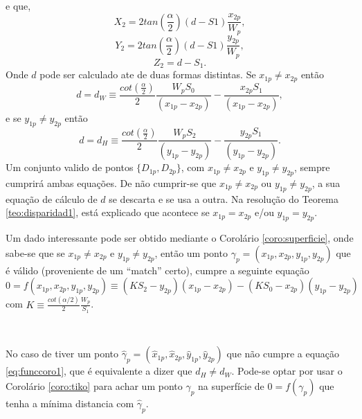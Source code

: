 \documentclass[a4paper,10pt]{article}
\begin{document}
e que,
\begin{equation}\label{eq:desloca3}
 X_2=2 tan(\frac{\alpha}{2})(d-S1)\frac{x_{2p}}{W_p},
\end{equation}
\begin{equation}\label{eq:desloca3a}
 Y_2=2 tan(\frac{\alpha}{2})(d-S1)\frac{y_{2p}}{W_p},
\end{equation}
\begin{equation}\label{eq:desloca4a}
 Z_2=d-S_1.
\end{equation}
Onde $d$ pode ser calculado ate de duas formas distintas. 
Se $x_{1p}\neq x_{2p}$ então
\begin{equation}\label{eq:desloca1}
 d=d_W \equiv \frac{cot(\frac{\alpha}{2})}{2} \frac{W_p S_0}{(x_{1p}-x_{2p})}-\frac{x_{2p} S_1}{(x_{1p}-x_{2p})},
\end{equation}
e se $y_{1p}\neq y_{2p}$ então
\begin{equation}\label{eq:desloca1a}
 d=d_H \equiv \frac{cot(\frac{\alpha}{2})}{2} \frac{W_p S_2}{(y_{1p}-y_{2p})}-\frac{y_{2p} S_1}{(y_{1p}-y_{2p})}.
\end{equation}
Um conjunto valido de pontos $\{D_{1p},D_{2p}\}$, com $x_{1p} \neq x_{2p}$ e $y_{1p} \neq y_{2p}$, sempre cumprirá ambas equações.
De não cumprir-se que $x_{1p} \neq x_{2p}$ ou $y_{1p} \neq y_{2p}$, a sua equação  de cálculo de $d$ se descarta e se usa a outra. 
Na resolução do Teorema \ref{teo:disparidad1}, está explicado que acontece se $x_{1p} = x_{2p}$ e/ou $y_{1p} = y_{2p}$.
~\\

\begin{bclogo}[couleur=gray!30, arrondi=0.1,logo=\bccrayon,ombre=true]{}
Um dado interessante pode ser obtido mediante o Corolário \ref{coro:superficie},
onde sabe-se que se $x_{1p}\neq x_{2p}$ e $y_{1p}\neq y_{2p}$, então um ponto  $\gamma_p=(x_{1p},x_{2p},y_{1p},y_{2p})$
que é  válido (proveniente de um ``match'' certo), cumpre a seguinte equação
 \begin{equation}\label{eq:funccoro1}
  0 = f(x_{1p},x_{2p},y_{1p},y_{2p}) \equiv (K S_2-y_{2p})(x_{1p}-x_{2p})-(K S_0-x_{2p})(y_{1p}-y_{2p})
 \end{equation}
com $K \equiv \frac{cot(\alpha/2)}{2}\frac{W_p}{S_1}$.\\
\end{bclogo}
~\\
\begin{bclogo}[couleur=gray!30, arrondi=0.1,logo=\bccrayon,ombre=true]{}
No caso de tiver um ponto $\hat{\gamma}_p=(\hat{x}_{1p},\hat{x}_{2p},\hat{y}_{1p},\hat{y}_{2p})$ que
não cumpre a equação \ref{eq:funccoro1}, que é equivalente a dizer que $d_H \neq d_W$. Pode-se optar por usar o Corolário \ref{coro:tiko} para achar 
um ponto $\gamma_p$ na superfície de $0=f(\gamma_p)$ que tenha a mínima distancia com $\hat{\gamma}_p$.\\
\end{bclogo}
\end{document}
